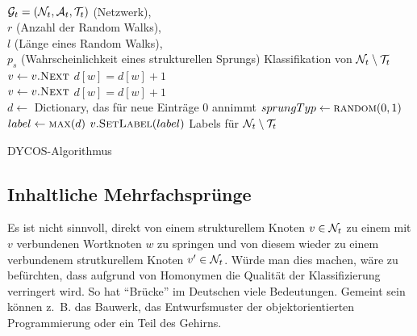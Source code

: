 \begin{algorithm}[H]
    \begin{algorithmic}
        \Require \\$\mathcal{G}_t = (\mathcal{N}_t, \mathcal{A}_t, \mathcal{T}_t)$ (Netzwerk),\\
                 $r$ (Anzahl der Random Walks),\\
                 $l$ (Länge eines Random Walks),\\
                 $p_s$ (Wahrscheinlichkeit eines strukturellen Sprungs)
        \Ensure  Klassifikation von $\mathcal{N}_t \setminus \mathcal{T}_t$\\

                \State $v \gets v.\Call{Next}{}$
                    \State $d[w] = d[w] + 1$
                \EndFor
            \EndFor
        \EndProcedure
        \\
                \State $v \gets v.\Call{Next}{}$ 
                    \State $d[w] = d[w] + 1$
                \EndFor
            \EndFor
        \EndProcedure
        \\

            \State $d \gets $ Dictionary, das für neue Einträge 0 annimmt
                \State $sprungTyp \gets \Call{random}{0, 1}$
                    \State {}
                \Else
                    \State {}
                \EndIf
            \EndFor
            \State $label \gets \Call{max}{d}$
            \State $v.\Call{SetLabel}{label}$
        \EndFor
        \State \Return Labels für $\mathcal{N}_t \setminus \mathcal{T}_t$
    \end{algorithmic}
\caption{DYCOS-Algorithmus}
\label{alg:DYCOS}
\end{algorithm}

\subsection{Inhaltliche Mehrfachsprünge}
Es ist nicht sinnvoll, direkt von einem strukturellem Knoten 
$v \in \mathcal{N}_t$ zu einem mit $v$ verbundenen Wortknoten $w$ zu springen
und von diesem wieder zu einem verbundenem strutkurellem Knoten 
$v' \in \mathcal{N}_t$. Würde man dies machen, wäre zu befürchten, dass
aufgrund von Homonymen die Qualität der Klassifizierung verringert
wird. So hat \enquote{Brücke} im Deutschen viele Bedeutungen.
Gemeint sein können z.~B. das Bauwerk, das Entwurfsmuster der
objektorientierten Programmierung oder ein Teil des Gehirns.

